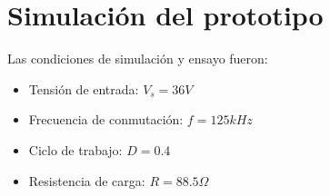 \section{Simulación del prototipo}

Las condiciones de simulación y ensayo fueron:

\begin{itemize}
    \item Tensión de entrada: $V_s=36V$
    \item Frecuencia de conmutación: $f=125kHz$
    \item Ciclo de trabajo: $D=0.4$
    \item Resistencia de carga: $R=88.5\Omega$
\end{itemize}
 










